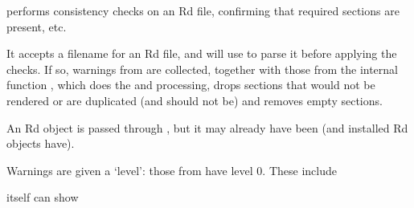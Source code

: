\begin{Details}\relax
{} performs consistency checks on an Rd file, confirming that
required sections are present, etc.

It accepts a filename for an Rd file, and will use
 to parse it before applying the checks.  If so,
warnings from  are collected, together with those from
the internal function , which does the
 and  processing, drops sections that
would not be rendered or are duplicated (and should not be) and
removes empty sections.

An Rd object is passed through , but it may already
have been (and installed Rd objects have).

Warnings are given a `level': those from  have
level 0.  These include

 itself can show


\end{Details}
